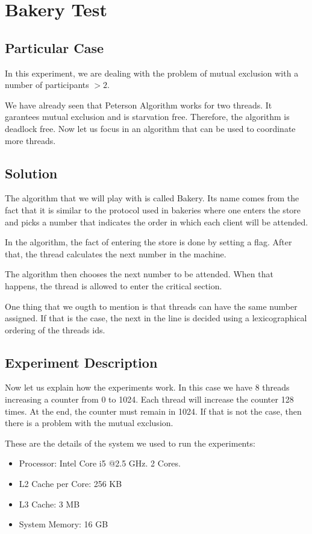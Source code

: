 \section{\textbf{Bakery Test}}
\subsection{Particular Case}
\par
In this experiment, we are dealing with the problem of mutual exclusion with a
number of participants $>2$.
\par
We have already seen that Peterson Algorithm works for two threads. It garantees
mutual exclusion and is starvation free. Therefore, the algorithm is deadlock
free. Now let us focus in an algorithm that can be used to coordinate more
threads.
\par
\subsection{Solution}
\par
The algorithm that we will play with is called Bakery. Its name comes from the
fact that it is similar to the protocol used in bakeries where one enters the
store and picks a number that indicates the order in which each client will be
attended. 
\par
In the algorithm, the fact of entering the store is done by setting a flag.
After that, the thread calculates the next number in the machine. 
\par
The algorithm then chooses the next number to be attended. When that happens,
the thread is allowed to enter the critical section.
\par
One thing that we ougth to mention is that threads can have the same number
assigned. If that is the case, the next in the line is decided using a
lexicographical ordering of the threads ids.
\subsection{Experiment Description}
\par
Now let us explain how the experiments work. In this case we have 8 threads
increasing a counter from 0 to 1024. Each thread will increase the counter 128
times. At the end, the counter must remain in 1024. If that is not the case,
then there is a problem with the mutual exclusion.
\par
These are the details of the system we used to run the experiments:
\begin{itemize}
\item Processor: Intel Core i5 @2.5 GHz. 2 Cores.
\item L2 Cache per Core: 256 KB
\item L3 Cache: 3 MB
\item System Memory: 16 GB
\end{itemize}
